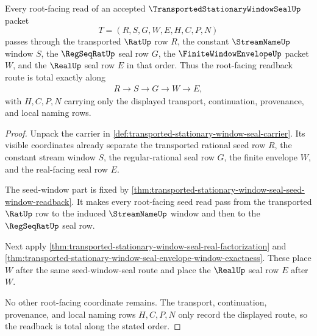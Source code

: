 \begin{theorem}
\label{thm:transported-stationary-window-seal-root-readback-totality}
Every root-facing read of an accepted $\TransportedStationaryWindowSealUp$ packet
$$
T=(R,S,G,W,E,H,C,P,N)
$$
passes through the transported $\RatUp$ row $R$, the constant $\StreamNameUp$ window $S$, the $\RegSeqRatUp$ seal row $G$, the $\FiniteWindowEnvelopeUp$ packet $W$, and the $\RealUp$ seal row $E$ in that order. Thus the root-facing readback route is total exactly along
$$
\begin{aligned}
  R \longrightarrow S \longrightarrow G \longrightarrow W \longrightarrow E,
\end{aligned}
$$
with $H,C,P,N$ carrying only the displayed transport, continuation, provenance, and local naming rows.
\end{theorem}
\begin{proof}
Unpack the carrier in \autoref{def:transported-stationary-window-seal-carrier}. Its visible coordinates already separate the transported rational seed row $R$, the constant stream window $S$, the regular-rational seal row $G$, the finite envelope $W$, and the real-facing seal row $E$.

The seed-window part is fixed by \autoref{thm:transported-stationary-window-seal-seed-window-readback}. It makes every root-facing seed read pass from the transported $\RatUp$ row to the induced $\StreamNameUp$ window and then to the $\RegSeqRatUp$ seal row.

Next apply \autoref{thm:transported-stationary-window-seal-real-factorization} and \autoref{thm:transported-stationary-window-seal-envelope-window-exactness}. These place $W$ after the same seed-window-seal route and place the $\RealUp$ seal row $E$ after $W$.

No other root-facing coordinate remains. The transport, continuation, provenance, and local naming rows $H,C,P,N$ only record the displayed route, so the readback is total along the stated order.
\end{proof}

